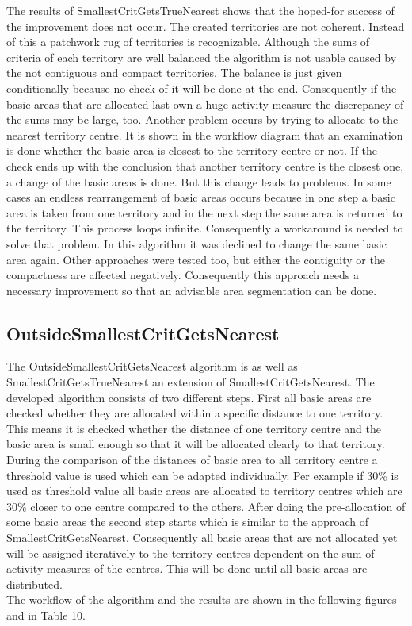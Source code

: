 \newpage
The results of SmallestCritGetsTrueNearest shows that the hoped-for success of the improvement does not occur. The created territories are not coherent. Instead of this a patchwork rug of territories is recognizable. Although the sums of criteria of each territory are well balanced the algorithm is not usable caused by the not contiguous and compact territories. The balance is just given conditionally because no check of it will be done at the end. Consequently if the basic areas that are allocated last own a huge activity measure the discrepancy of the sums may be large, too. Another problem occurs by trying to allocate to the nearest territory centre. It is shown in the workflow diagram that an examination is done whether the basic area is closest to the territory centre or not. If the check ends up with the conclusion that another territory centre is the closest one, a change of the basic areas is done. But this change leads to problems. In some cases an endless rearrangement of basic areas occurs because in one step a basic area is taken from one territory and in the next step the same area is returned to the territory. This process loops infinite. Consequently a workaround is needed to solve that problem. In this algorithm it was declined to change the same basic area again. Other approaches were tested too, but either the contiguity or the compactness are affected negatively. Consequently this approach needs a necessary improvement so that an advisable area segmentation can be done.


\subsection{OutsideSmallestCritGetsNearest}

The OutsideSmallestCritGetsNearest algorithm is as well as SmallestCritGetsTrueNearest an extension of SmallestCritGetsNearest. The developed algorithm consists of two different steps. First all basic areas are checked whether they are allocated within a specific distance to one territory. This means it is checked whether the distance of one territory centre and the basic area is small enough so that it will be allocated clearly to that territory. During the comparison of the distances of basic area to all territory centre a threshold value is used which can be adapted individually. Per example if 30\% is used as threshold value all basic areas are allocated to territory centres which are 30\% closer to one centre compared to the others. After doing the pre-allocation of some basic areas the second step starts which is similar to the approach of SmallestCritGetsNearest. Consequently all basic areas that are not allocated yet will be assigned iteratively to the territory centres dependent on the sum of activity measures of the centres. This will be done until all basic areas are distributed.\\
The workflow of the algorithm and the results are shown in the following figures and in Table 10.

